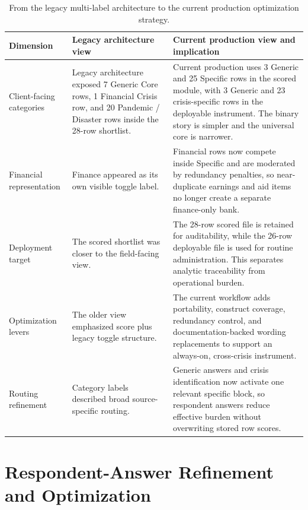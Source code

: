 \documentclass[12pt]{article}
\begin{document}
\begin{table}[H]
\centering
\footnotesize
\begin{tabularx}{\textwidth}{L{0.20\textwidth} Y Y}
\toprule
Dimension & Legacy architecture view & Current production view and implication \\
\midrule
Client-facing categories & Legacy architecture exposed 7 Generic Core rows, 1 Financial Crisis row, and 20 Pandemic / Disaster rows inside the 28-row shortlist. & Current production uses 3 Generic and 25 Specific rows in the scored module, with 3 Generic and 23 crisis-specific rows in the deployable instrument. The binary story is simpler and the universal core is narrower. \\
Financial representation & Finance appeared as its own visible toggle label. & Financial rows now compete inside Specific and are moderated by redundancy penalties, so near-duplicate earnings and aid items no longer create a separate finance-only bank. \\
Deployment target & The scored shortlist was closer to the field-facing view. & The 28-row scored file is retained for auditability, while the 26-row deployable file is used for routine administration. This separates analytic traceability from operational burden. \\
Optimization levers & The older view emphasized score plus legacy toggle structure. & The current workflow adds portability, construct coverage, redundancy control, and documentation-backed wording replacements to support an always-on, cross-crisis instrument. \\
Routing refinement & Category labels described broad source-specific routing. & Generic answers and crisis identification now activate one relevant specific block, so respondent answers reduce effective burden without overwriting stored row scores. \\
\bottomrule
\end{tabularx}
\caption{From the legacy multi-label architecture to the current production optimization strategy.}
\end{table}

\section{Respondent-Answer Refinement and Optimization}
\end{document}

